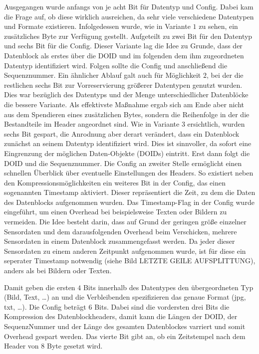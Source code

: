 Ausgegangen wurde anfangs von je acht Bit für Datentyp und Config. Dabei kam die
Frage auf, ob diese wirklich ausreichen, da sehr viele verschiedene Datentypen
und Formate existieren. Infolgedessen wurde, wie in Variante $1$ zu sehen, ein
zusätzliches Byte zur Verfügung gestellt. Aufgeteilt zu zwei Bit für den
Datentyp und sechs Bit für die Config. Dieser Variante lag die Idee zu Grunde,
dass der Datenblock als erstes über die DOID und im folgenden dem ihm
zugeordneten Datentyp identifiziert wird. Folgen sollte die Config und
anschließend die Sequenznummer. Ein ähnlicher Ablauf galt auch für Möglichkeit
$2$, bei der die restlichen sechs Bit zur Vorreservierung größerer Datentypen
genutzt wurden. Dies war bezüglich des Datentyps und der Menge unterschiedlicher
Datenblöcke die bessere Variante.  Als effektivste Maßnahme
ergab sich am Ende aber nicht aus dem Spendieren eines zusätzlichen Bytes,
sondern die Reihenfolge in der die Bestandteile im Header angeordnet sind. Wie
in Variante $3$ ersichtlich, wurden sechs Bit gespart, die Anrodnung aber derart
verändert, dass ein Datenblock zunächst an seinem Datentyp identifiziert wird.
Dies ist sinnvoller, da sofort eine Eingrenzung der möglichen Daten-Objekte
(DOIDs) eintritt. Erst dann folgt die DOID und die Sequenznummer. Die Config
an zweiter Stelle ermöglicht einen schnellen Überblick über eventuelle
Einstellungen des Headers. So existiert neben den Kompressionsmöglichkeiten ein
weiteres Bit in der Config, das einen sogenannten Timestamp aktiviert. Dieser
repräsentiert die Zeit, zu dem die Daten des Datenblocks aufgenommen wurden. Das
Timestamp-Flag in der Config wurde eingeführt, um einen Overhead bei
beispielsweise Texten oder Bildern zu vermeiden. Die Idee besteht darin, dass
auf Grund der geringen größe einzelner Sensordaten und dem darausfolgenden
Overhead beim Verschicken, mehrere Sensordaten in einem Datenblock
zusammengefasst werden. Da jeder dieser Sensordaten zu einem anderen Zeitpunkt
aufgenommen wurde, ist für diese ein seperater Timestamp notwendig (siehe Bild
LETZTE GEILE AUFSPLITTUNG), anders als bei Bildern oder Texten. 

Damit geben die ersten $4$ Bits innerhalb des Datentypes den übergeordneten Typ
(Bild, Text, \ldots) an und die Verbleibenden spezifizieren das genaue Format
(jpg, txt, \ldots). Die Config beträgt $6$ Bits. Dabei sind die vordersten drei
Bits die Kompression des Datenblockheaders, damit kann die Längen der DOID, der
SequenzNummer und der Länge des gesamten Datenblockes varriert und somit
Overhead gespart werden. Das vierte Bit gibt an, ob ein Zeitstempel nach dem
Header von $8$ Byte gesetzt wird.

